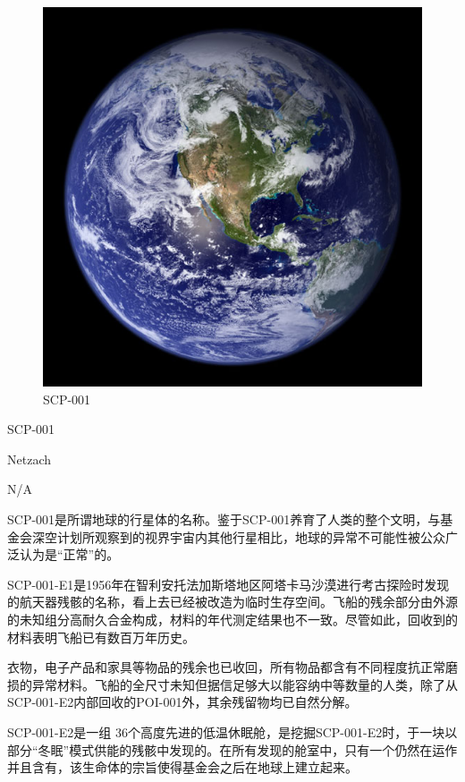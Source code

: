 \hr

\begin{scpbox}


\end{scpbox}

\begin{scpbox}

\begin{figure}[H]
    \centering
    \includegraphics[width=0.5\linewidth]{images/SCP-001-the-world-at-large-2.jpg}
    \caption*{SCP-001}
\end{figure}

SCP-001

Netzach 

N\slash A

SCP-001是所谓地球的行星体的名称。鉴于SCP-001养育了人类的整个文明，与基金会深空计划所观察到的视界宇宙内其他行星相比，地球的异常不可能性被公众广泛认为是“正常”的。

SCP-001-E1是1956年在智利安托法加斯塔地区阿塔卡马沙漠进行考古探险时发现的航天器残骸的名称，看上去已经被改造为临时生存空间。飞船的残余部分由外源的未知组分高耐久合金构成，材料的年代测定结果也不一致。尽管如此，回收到的材料表明飞船已有数百万年历史。

衣物，电子产品和家具等物品的残余也已收回，所有物品都含有不同程度抗正常磨损的异常材料。飞船的全尺寸未知但据信足够大以能容纳中等数量的人类，除了从SCP-001-E2内部回收的POI-001外，其余残留物均已自然分解。

SCP-001-E2是一组 36个高度先进的低温休眠舱，是挖掘SCP-001-E2时，于一块以部分“冬眠”模式供能的残骸中发现的。在所有发现的舱室中，只有一个仍然在运作并且含有\mono{{[}应监督者要求删除]}，该生命体的宗旨使得基金会之后在地球上建立起来。

\end{scpbox}


